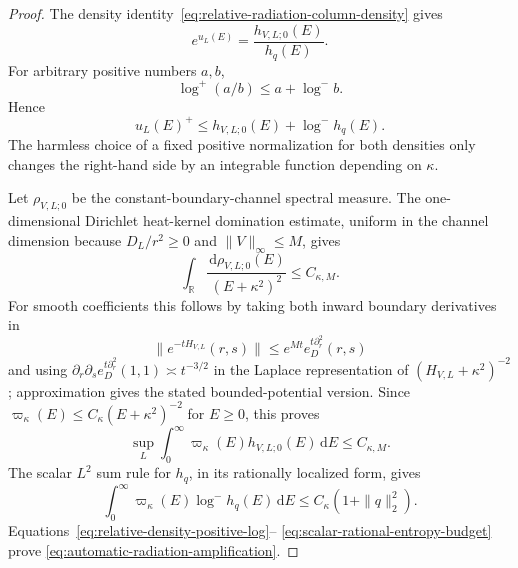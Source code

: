 \documentclass[11pt]{article}
\newcommand{\dd}{\,\mathrm d}
\theoremstyle{definition}
\theoremstyle{remark}
\begin{document}
\begin{proof}
The density identity~\eqref{eq:relative-radiation-column-density} gives
\begin{equation}
 e^{u_L(E)}=\frac{h_{V,L;0}(E)}{h_q(E)}.
\end{equation}
For arbitrary positive numbers $a,b$,
\begin{equation}
 \log^+(a/b)\leq a+\log^-b.
 \label{eq:elementary-density-amplification}
\end{equation}
Hence
\begin{equation}
 u_L(E)^+\leq h_{V,L;0}(E)+\log^-h_q(E).
 \label{eq:relative-density-positive-log}
\end{equation}
The harmless choice of a fixed positive normalization for both densities only
changes the right-hand side by an integrable function depending on $\kappa$.

Let $\rho_{V,L;0}$ be the constant-boundary-channel spectral measure.  The
one-dimensional Dirichlet heat-kernel domination estimate, uniform in the
channel dimension because $D_L/r^2\geq0$ and $\|V\|_\infty\leq M$, gives
\begin{equation}
 \int_\mathbb R\frac{\dd\rho_{V,L;0}(E)}{(E+\kappa^2)^2}
 \leq C_{\kappa,M}.
 \label{eq:uniform-boundary-resolvent-square-mass}
\end{equation}
For smooth coefficients this follows by taking both inward boundary
derivatives in
\begin{equation}
 \|e^{-tH_{V,L}}(r,s)\|
 \leq e^{Mt}e^{t\partial_r^2}_{D}(r,s)
\end{equation}
and using
$\partial_r\partial_s e^{t\partial_r^2}_{D}(1,1)\asymp t^{-3/2}$ in the
Laplace representation of $(H_{V,L}+\kappa^2)^{-2}$; approximation gives the
stated bounded-potential version.  Since
$\varpi_\kappa(E)\leq C_\kappa(E+\kappa^2)^{-2}$ for $E\geq0$, this proves
\begin{equation}
 \sup_L\int_0^\infty\varpi_\kappa(E)h_{V,L;0}(E)\dd E
 \leq C_{\kappa,M}.
 \label{eq:uniform-weighted-boundary-mass}
\end{equation}
The scalar $L^2$ sum rule for $h_q$, in its rationally localized form, gives
\begin{equation}
 \int_0^\infty\varpi_\kappa(E)\log^-h_q(E)\dd E
 \leq C_\kappa(1+\|q\|_2^2).
 \label{eq:scalar-rational-entropy-budget}
\end{equation}
Equations~\eqref{eq:relative-density-positive-log}--
\eqref{eq:scalar-rational-entropy-budget} prove
\eqref{eq:automatic-radiation-amplification}.


\end{proof}
\end{document}
